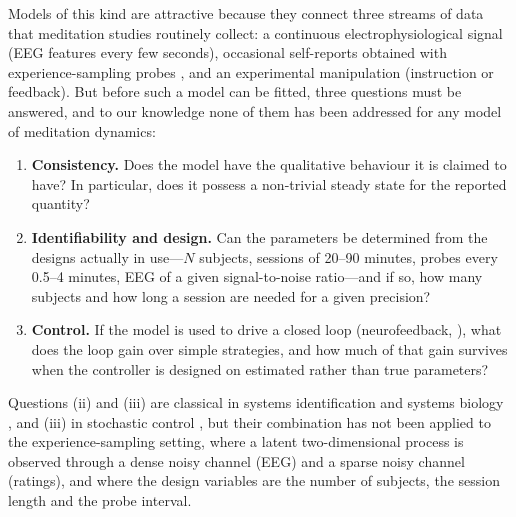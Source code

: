 \documentclass[12pt,a4paper]{article}
\theoremstyle{plain}
\theoremstyle{definition}
\theoremstyle{remark}
\begin{document}
Models of this kind are attractive because they connect three streams of data that meditation studies routinely collect: a continuous electrophysiological signal (EEG features every few seconds), occasional self-reports obtained with experience-sampling probes \citep{Hasenkamp2012,Weinstein2018,Brandmeyer2018}, and an experimental manipulation (instruction or feedback). But before such a model can be fitted, three questions must be answered, and to our knowledge none of them has been addressed for any model of meditation dynamics:
\begin{enumerate}[label=(\roman*)]
  \item \textbf{Consistency.} Does the model have the qualitative behaviour it is claimed to have? In particular, does it possess a non-trivial steady state for the reported quantity?
  \item \textbf{Identifiability and design.} Can the parameters be determined from the designs actually in use---$N$ subjects, sessions of 20--90 minutes, probes every 0.5--4 minutes, EEG of a given signal-to-noise ratio---and if so, how many subjects and how long a session are needed for a given precision?
  \item \textbf{Control.} If the model is used to drive a closed loop (neurofeedback, \citealp{Sitaram2017,Ros2020}), what does the loop gain over simple strategies, and how much of that gain survives when the controller is designed on estimated rather than true parameters?
\end{enumerate}
Questions (ii) and (iii) are classical in systems identification and systems biology \citep{Bellman1970,Rothenberg1971,Walter1997,Ljung1999,Raue2009,Chis2011,Villaverde2016,Wieland2021,Kreutz2009}, and (iii) in stochastic control \citep{Astrom1970,Anderson1990}, but their combination has not been applied to the experience-sampling setting, where a latent two-dimensional process is observed through a dense noisy channel (EEG) and a sparse noisy channel (ratings), and where the design variables are the number of subjects, the session length and the probe interval.
\end{document}
